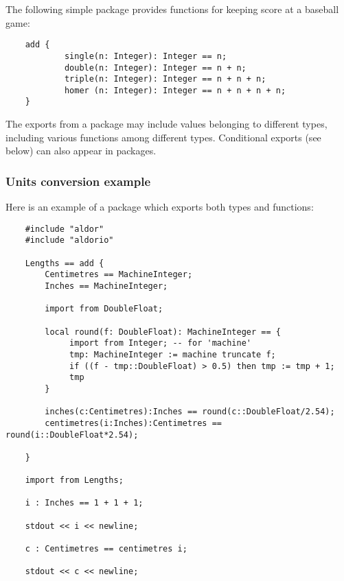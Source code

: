 The following simple package provides functions for keeping
score at a baseball game:

\begin{small}
\begin{verbatim}
    add {
            single(n: Integer): Integer == n;
            double(n: Integer): Integer == n + n;
            triple(n: Integer): Integer == n + n + n;
            homer (n: Integer): Integer == n + n + n + n;
    }
\end{verbatim}
\end{small}

The exports from a package may include values belonging to different types,
including various functions among different types.  Conditional exports
(see below) can also appear in packages.

\subsubsection{Units conversion example}

Here is an example of a package which exports both types and functions:

\begin{small}
\begin{verbatim}
    #include "aldor"
    #include "aldorio"

    Lengths == add {
        Centimetres == MachineInteger;
        Inches == MachineInteger;

        import from DoubleFloat;

        local round(f: DoubleFloat): MachineInteger == {
             import from Integer; -- for 'machine'
             tmp: MachineInteger := machine truncate f;
             if ((f - tmp::DoubleFloat) > 0.5) then tmp := tmp + 1;
             tmp
        }

        inches(c:Centimetres):Inches == round(c::DoubleFloat/2.54);
        centimetres(i:Inches):Centimetres == round(i::DoubleFloat*2.54);

    }

    import from Lengths;

    i : Inches == 1 + 1 + 1;

    stdout << i << newline;

    c : Centimetres == centimetres i;

    stdout << c << newline;

\end{verbatim}
\end{small}

